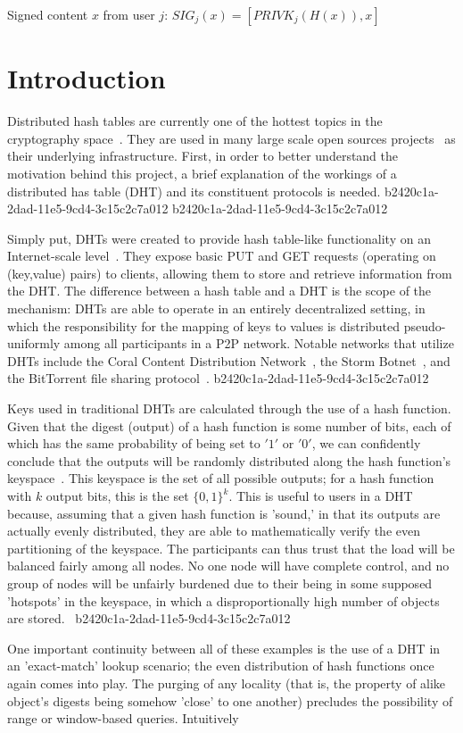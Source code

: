 \documentclass[12pt]{article}
\begin{document}
Signed content $x$ from user $j$: $SIG_j(x) = \left[ PRIVK_j( H(x) ), x \right]$

\section{Introduction}
\par Distributed hash tables are currently one of the hottest topics in the cryptography space~\cite{Stoica:2001dj,Rowstron:2001ea,Ratnasamy:2001wn}. They are used in many large scale open sources projects~\cite{Freitas:2013tb,Xu:2010vs,Perfitt:2010fh} as their underlying infrastructure. First, in order to better understand the motivation behind this project, a brief explanation of the workings of a distributed has table (DHT) and its constituent protocols is needed.
b2420c1a-2dad-11e5-9cd4-3c15c2c7a012
b2420c1a-2dad-11e5-9cd4-3c15c2c7a012\par Simply put, DHTs were created to provide hash table-like functionality on an Internet-scale level~\cite{Ratnasamy:2001wn}. They expose basic PUT and GET requests (operating on (key,value) pairs) to clients, allowing them to store and retrieve information from the DHT. The difference between a hash table and a DHT is the scope of the mechanism: DHTs are able to operate in an entirely decentralized setting, in which the responsibility for the mapping of keys to values is distributed pseudo-uniformly among all participants in a P2P network. Notable networks that utilize DHTs include the Coral Content Distribution Network~\cite{Freedman:2004vb}, the Storm Botnet~\cite{Holz:2008uk}, and the BitTorrent file sharing protocol~\cite{Cohen:y1_8mBnw}.
b2420c1a-2dad-11e5-9cd4-3c15c2c7a012
\par Keys used in traditional DHTs are calculated through the use of a hash function. Given that the digest (output) of a hash function is some number of bits, each of which has the same probability of being set to $'1'$ or $'0'$, we can confidently conclude that the outputs will be randomly distributed along the hash function's keyspace~. This keyspace is the set of all possible outputs; for a hash function with $k$ output bits, this is the set $\{0,1\}^k$. This is useful to users in a DHT because, assuming that a given hash function is 'sound,' in that its outputs are actually evenly distributed, they are able to mathematically verify the even partitioning of the keyspace. The participants can thus trust that the load will be balanced fairly among all nodes. No one node will have complete control, and no group of nodes will be unfairly burdened due to their being in some supposed 'hotspots' in the keyspace, in which a disproportionally high number of objects are stored.~
b2420c1a-2dad-11e5-9cd4-3c15c2c7a012
\par One important continuity between all of these examples is the use of a DHT in an 'exact-match' lookup scenario; the even distribution of hash functions once again comes into play. The purging of any locality (that is, the property of alike object's digests being somehow 'close' to one another) precludes the possibility of range or window-based queries. Intuitively
\end{document}
